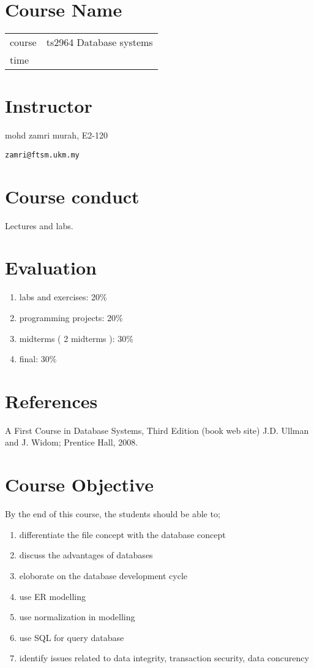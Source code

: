 \documentclass[12pt,a4paper]{article}
\begin{document}
\section{Course Name}
\begin{tabular}{ll}
	course	& ts2964 Database systems\\
	time    & 
\end{tabular}

\section{Instructor}
mohd zamri murah, E2-120\par
\verb|zamri@ftsm.ukm.my|

\section{Course conduct}

Lectures and labs.
\section{Evaluation}
\begin{enumerate}
	\item labs and exercises: 20\%
	\item programming projects: 20\%
	\item midterms ( 2 midterms ): 30\%
	\item final: 30\%  
\end{enumerate}

\section{References}
A First Course in Database Systems, Third Edition (book web site)
J.D. Ullman and J. Widom; Prentice Hall, 2008.

\section{Course Objective}
By the end of this course, the students should be able to;
\begin{enumerate}
	\item differentiate the file concept with  the database concept
	\item discuss the advantages of databases
	\item eloborate on the database development cycle
	\item use ER modelling
	\item use normalization in modelling
	\item use SQL for query database
	\item identify issues related to data integrity, transaction security, data concurency
\end{enumerate}
\end{document}

